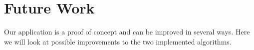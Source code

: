 \chapter{Future Work}
\emptyTop{}
Our application is a proof of concept and can be improved in several ways. Here we will look at possible improvements to the two implemented algorithms.



